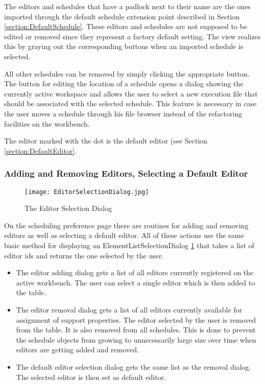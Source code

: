 The editors and schedules that have a padlock next to their name are the ones imported through the default schedule 
extension point described in Section \ref{section:DefaultSchedule}. These editors and schedules are not supposed
to be edited or removed since they represent a factory default setting. The view realizes this by graying out the 
corresponding buttons when an imported schedule is selected.

All other schedules can be removed by simply clicking the appropriate button. The button for editing the location
of a schedule opens a dialog showing the currently active workspace and allows the user to select a new
execution file that should be associated with the selected schedule. This feature is necessary in case the user
moves a schedule through his file browser instead of the refactoring facilities on the workbench.

The editor marked with the dot is the default editor (see Section \ref{section:DefaultEditor}.

\subsubsection{Adding and Removing Editors, Selecting a Default Editor}
\begin{figure}[EditorSelectionDialog]
  \centering
  \texttt{[image: EditorSelectionDialog.jpg]}
  \caption[Editor Selection Dialog]%
  {The Editor Selection Dialog\protect}
  \label{fig:EditorSelectionDialog}
\end{figure}

On the scheduling preference page there are routines for adding and removing
editors as well as selecting a default editor.
All of these actions use the same basic method for displaying an ElementListSelectionDialog \ref{fig:EditorSelectionDialog}
that takes a list of editor ids and returns the one selected by the user.
\begin{itemize}
 \item The editor adding dialog gets a list of all editors currently registered on the
 active workbench. The user can select a single editor which is then added to the table.
 \item The editor removal dialog gets a list of all editors currently available for 
 assignment of support properties. The editor selected by the user is removed from the table.
 It is also removed from all schedules. This is done to prevent the schedule objects from growing
 to unnecessarily large size over time when editors are getting added and removed.
 \item The default editor selection dialog gets the same list as the removal dialog. The selected
 editor is then set as default editor. 
\end{itemize}


